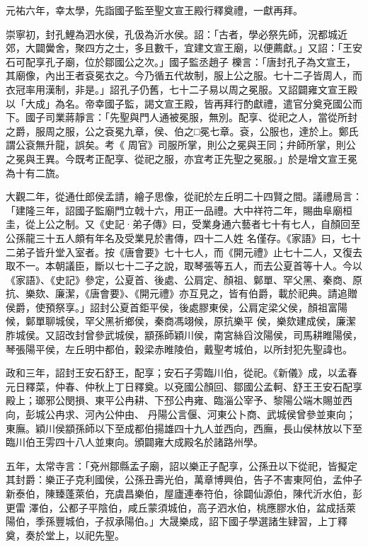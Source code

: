 \begin{pinyinscope}
 元祐六年，幸太學，先詣國子監至聖文宣王殿行釋奠禮，一獻再拜。



 崇寧初，封孔鯉為泗水侯，孔伋為沂水侯。詔：「古者，學必祭先師，況都城近郊，大闢黌舍，聚四方之士，多且數千，宜建文宣王廟，以便薦獻。」又詔：「王安石可配享孔子廟，位於鄒國公之次。」國子監丞趙子
 櫟言：「唐封孔子為文宣王，其廟像，內出王者袞冕衣之。今乃循五代故制，服上公之服。七十二子皆周人，而衣冠率用漢制，非是。」詔孔子仍舊，七十二子易以周之冕服。又詔闢雍文宣王殿以「大成」為名。帝幸國子監，謁文宣王殿，皆再拜行酌獻禮，遣官分奠兗國公而下。國子司業蔣靜言：「先聖與門人通被冕服，無別。配享、從祀之人，當從所封之爵，服周之服，公之袞冕九章，侯、伯之□冕七章。袞，公服也，達於上。鄭氏謂公袞無升龍，誤矣。考《
 周官》司服所掌，則公之冕與王同；弁師所掌，則公之冕與王異。今既考正配享、從祀之服，亦宜考正先聖之冕服。」於是增文宣王冕為十有二旒。



 大觀二年，從通仕郎侯孟請，繪子思像，從祀於左丘明二十四賢之間。議禮局言：「建隆三年，詔國子監廟門立戟十六，用正一品禮。大中祥符二年，賜曲阜廟桓圭，從上公之制。又《史記·弟子傳》曰，受業身通六藝者七十有七人，自顏回至公孫龍三十五人頗有年名及受業見於書傳，四十二人姓
 名僅存。《家語》曰，七十二弟子皆升堂入室者。按《唐會要》七十七人，而《開元禮》止七十二人，又復去取不一。本朝議臣，斷以七十二子之說，取琴張等五人，而去公夏首等十人。今以《家語》、《史記》參定，公夏首、後處、公肩定、顏祖、鄡單、罕父黑、秦商、原抗、樂欬、廉潔，《唐會要》、《開元禮》亦互見之，皆有伯爵，載於祀典。請追贈侯爵，使預祭享。」詔封公夏首鉅平侯，後處膠東侯，公肩定梁父侯，顏祖富陽候，鄡單聊城侯，罕父黑祈鄉侯，秦商馮翊候，原抗樂平
 侯，樂欬建成侯，廉潔胙城侯。又詔改封曾參武城侯，顓孫師穎川侯，南宮絲舀汶陽侯，司馬耕睢陽侯，琴張陽平侯，左丘明中都伯，穀梁赤睢陵伯，戴聖考城伯，以所封犯先聖諱也。



 政和三年，詔封王安石舒王，配享；安石子雱臨川伯，從祀。《新儀》成，以孟春元日釋菜，仲春、仲秋上丁日釋奠。以兗國公顏回、鄒國公孟軻、舒王王安石配享殿上；瑯邪公閔損、東平公冉耕、下邳公冉雍、臨淄公宰予、黎陽公端木賜並西向，彭城公冉求、河內公仲由、
 丹陽公言偃、河東公卜商、武城侯曾參並東向；東廡。穎川侯顓孫師以下至成都伯揚雄四十九人並西向，西廡，長山侯林放以下至臨川伯王雱四十八人並東向。頒闢雍大成殿名於諸路州學。



 五年，太常寺言：「兗州鄒縣孟子廟，詔以樂正子配享，公孫丑以下從祀，皆擬定其封爵：樂正子克利國侯，公孫丑壽光伯，萬章博興伯，告子不害東阿伯，孟仲子新泰伯，陳臻蓬萊伯，充虞昌樂伯，屋廬連奉符伯，徐闢仙源伯，陳代沂水伯，彭更雷
 澤伯，公都子平陰伯，咸丘蒙須城伯，高子泗水伯，桃應膠水伯，盆成括萊陽伯，季孫豐城伯，子叔承陽伯。」大晟樂成，詔下國子學選諸生肄習，上丁釋奠，奏於堂上，以祀先聖。




\end{pinyinscope}
